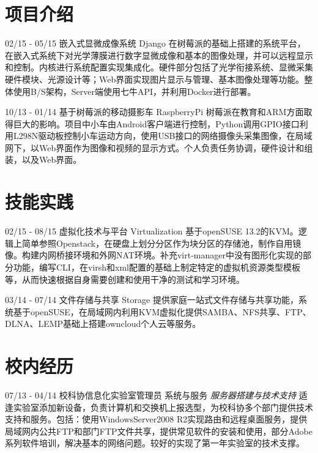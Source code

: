 \documentclass[]{friggeri-cv}
\begin{document}
\section{项目介绍}
\begin{entrylist}
  \entry
    {02/15 - 05/15}
    {嵌入式显微成像系统}
    {Django}
    {在树莓派的基础上搭建的系统平台，在嵌入式系统下对光学薄膜进行数字显微成像和基本的图像处理，并可以远程显示和控制。内核进行系统配置实现集成化。硬件部分包括了光学衔接系统、显微采集硬件模块、光源设计等；Web界面实现图片显示与管理、基本图像处理等功能。整体使用B/S架构，Server端使用七牛API，并利用Docker进行部署。
   \\ }%

   \entry
   {10/13 - 01/14}
   {基于树莓派的移动摄影车}
   {RaspberryPi}
   {
    树莓派在教育和ARM方面取得巨大的影响。项目中小车由Android客户端进行控制，Python调用GPIO接口利用L298N驱动板控制小车运动方向，使用USB接口的网络摄像头采集图像，在局域网下，以Web界面作为图像和视频的显示方式。个人负责任务协调，硬件设计和组装，以及Web界面。
   }
   
\end{entrylist}

\section{技能实践}
\begin{entrylist}
  \entry
    {02/15 - 08/15 }
    {虚拟化技术与平台}
    {Virtualization}
    {基于openSUSE 13.2的KVM。逻辑上简单参照Openstack，在硬盘上划分分区作为块分区的存储池，制作自用镜像。构建内网桥接环境和外网NAT环境。补充virt-manager中没有图形化实现的部分功能，编写CLI，在virsh和xml配置的基础上制定特定的虚拟机资源类型模板等，从而快速根据自身需要创建和使用干净的测试和学习环境。
    \\}   
	{
	
	
	}
  \entry
    {03/14 - 07/14 }
    {文件存储与共享}
    {Storage}
    {提供家庭一站式文件存储与共享功能，系统基于openSUSE，在局域网内利用KVM虚拟化提供SAMBA、NFS共享、FTP、DLNA、LEMP基础上搭建owncloud个人云等服务。\\}%
    



\end{entrylist}

\section{校内经历}
\begin{entrylist}
  \entry
    {07/13 - 04/14}
    {校科协信息化实验室管理员}
    {系统与服务}
    {\emph{服务器搭建与技术支持}
    适逢实验室添加新设备，负责计算机和交换机上报选型，为校科协多个部门提供技术支持和服务。包括：使用WindowsServer2008 R2实现路由和远程桌面服务，提供局域网内公共FTP和部门FTP文件共享，提供常见软件的安装和使用，部分Adobe系列软件培训，解决基本的网络问题。较好的实现了第一年实验室的技术支撑。  \\     
    }
    
\end{entrylist}
\end{document}
